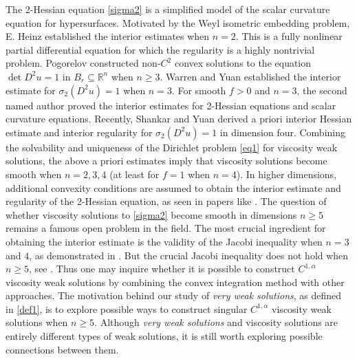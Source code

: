 \documentclass[reqno,12pt]{amsart}
\numberwithin{equation}{section}
\theoremstyle{plain}
\theoremstyle{definition}
\begin{document}
The 2-Hessian equation \eqref{sigma2} is a simplified model of the scalar curvature equation for hypersurfaces. Motivated by the Weyl isometric embedding problem, E. Heinz \cite{heinz1959elliptic} established the interior estimates when $n=2$. This is a fully nonlinear partial differential equation for which the regularity is a highly nontrivial problem. Pogorelov \cite{pogorelov1978multidimensional} constructed non-$C^2$ convex solutions to the equation $\det D^{2}u=1$ in $B_{r}\subseteq\mathbb{R}^{n}$ when $n\geq3$. Warren and Yuan \cite{warren2009hessian} established the interior estimate for $\sigma_2(D^2 u)=1$ when $n=3$. For smooth $f>0$ and $n=3$, the second named author \cite{qiu2017interior, qiu2019interior} proved the interior estimates for 2-Hessian equations and scalar curvature equations.
Recently, Shankar and Yuan \cite{shankar2023hessian} derived a priori interior Hessian estimate and interior regularity for $\sigma_2(D^2 u)=1$ in dimension four.  Combining the solvability and uniqueness of the Dirichlet problem \eqref{eq1} for viscosity weak solutions, the above a priori estimates imply that viscosity solutions become smooth when $n=2,3,4$ (at least for $f=1$ when $n=4$). In higher dimensions, additional convexity conditions are assumed to obtain the interior estimate and regularity of the 2-Hessian equation, as seen in papers like \cite{guan2019interior, mcgonagle2019hessian, shankar2020hessian, Mooney2021PAMS,shanker2021regularity}. The question of whether viscosity solutions to \eqref{sigma2} become smooth in dimensions $n \geq 5$ remains a famous open problem in the field. The most crucial ingredient for obtaining the interior estimate is the validity of the Jacobi inequality when $n=3$ and $4$, as demonstrated in \cite{warren2009hessian, qiu2017interior, shankar2023hessian}. But the crucial Jacobi inequality does not hold when $n\geq 5$, see \cite{shankar2023hessian}. Thus one may inquire whether it is possible to construct $C^{1,\alpha}$ viscosity weak solutions by combining the convex integration method with other approaches. The motivation behind our study of \emph{very weak solutions}, as defined in \ref{def1}, is to explore possible ways to construct singular $C^{1,\alpha}$ viscosity weak solutions when $n \geq 5$. Although \emph{very weak solutions} and viscosity solutions are entirely different types of weak solutions, it is still worth exploring possible connections between them.
\end{document}

